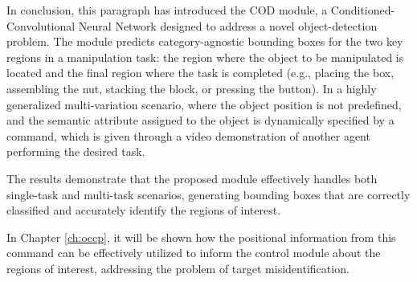 In conclusion, this paragraph has introduced the COD module, a Conditioned-Convolutional Neural Network designed to address a novel object-detection problem. The module predicts category-agnostic bounding boxes for the two key regions in a manipulation task: the region where the object to be manipulated is located and the final region where the task is completed (e.g., placing the box, assembling the nut, stacking the block, or pressing the button). In a highly generalized multi-variation scenario, where the object position is not predefined, and the semantic attribute assigned to the object is dynamically specified by a command, which is given through a video demonstration of another agent performing the desired task.


The results demonstrate that the proposed module effectively handles both single-task and multi-task scenarios, generating bounding boxes that are correctly classified and accurately identify the regions of interest.

In Chapter \ref{ch:occp}, it will be shown how the positional information from this command can be effectively utilized to inform the control module about the regions of interest, addressing the problem of target misidentification.
